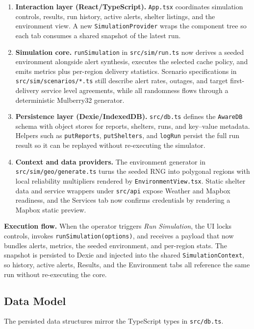 \begin{enumerate}
    \item \textbf{Interaction layer (React/TypeScript).} \texttt{App.tsx} coordinates simulation controls, results, run history, active alerts, shelter listings, and the environment view. A new \texttt{SimulationProvider} wraps the component tree so each tab consumes a shared snapshot of the latest run.
    \item \textbf{Simulation core.} \texttt{runSimulation} in \texttt{src/sim/run.ts} now derives a seeded environment alongside alert synthesis, executes the selected cache policy, and emits metrics plus per-region delivery statistics. Scenario specifications in \texttt{src/sim/scenarios/*.ts} still describe alert rates, outages, and target first-delivery service level agreements, while all randomness flows through a deterministic Mulberry32 generator.
    \item \textbf{Persistence layer (Dexie/IndexedDB).} \texttt{src/db.ts} defines the \texttt{AwareDB} schema with object stores for reports, shelters, runs, and key--value metadata. Helpers such as \texttt{putReports}, \texttt{putShelters}, and \texttt{logRun} persist the full run result so it can be replayed without re-executing the simulator.
    \item \textbf{Context and data providers.} The environment generator in \texttt{src/sim/geo/generate.ts} turns the seeded RNG into polygonal regions with local reliability multipliers rendered by \texttt{EnvironmentView.tsx}. Static shelter data and service wrappers under \texttt{src/api} expose Weather and Mapbox readiness, and the Services tab now confirms credentials by rendering a Mapbox static preview.
\end{enumerate}

\noindent\textbf{Execution flow.} When the operator triggers \emph{Run Simulation}, the UI locks controls, invokes \texttt{runSimulation(options)}, and receives a payload that now bundles alerts, metrics, the seeded environment, and per-region stats. The snapshot is persisted to Dexie and injected into the shared \texttt{SimulationContext}, so history, active alerts, Results, and the Environment tabs all reference the same run without re-executing the core.

\subsection{Data Model}
The persisted data structures mirror the TypeScript types in \texttt{src/db.ts}.

